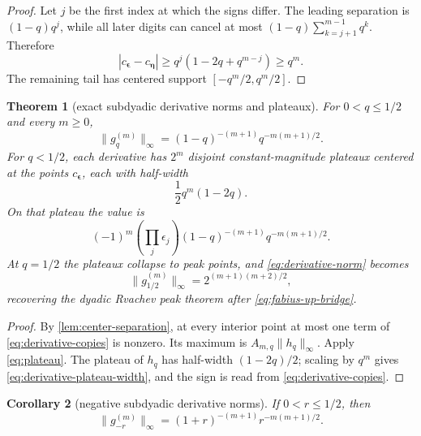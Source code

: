\documentclass[11pt]{article}
\newtheorem{theorem}{Theorem}[section]
\newtheorem{corollary}[theorem]{Corollary}
\theoremstyle{definition}
\theoremstyle{remark}
\begin{document}
\begin{proof}
Let $j$ be the first index at which the signs differ.  The leading separation is $(1-q)q^j$, while all later digits can cancel at most
$(1-q)\sum_{k=j+1}^{m-1}q^k$.  Therefore
\[
 |c_{\bm\epsilon}-c_{\bm\eta}|
 \ge q^j(1-2q+q^{m-j})\ge q^m.
\]
The remaining tail has centered support $[-q^m/2,q^m/2]$.
\end{proof}

\begin{theorem}[exact subdyadic derivative norms and plateaux]\label{thm:derivative-norm}
For $0<q\le1/2$ and every $m\ge0$,
\begin{equation}\label{eq:derivative-norm}
 \boxed{\quad
 \|g_q^{(m)}\|_\infty
 =(1-q)^{-(m+1)}q^{-m(m+1)/2}.
 \quad}
\end{equation}
For $q<1/2$, each derivative has $2^m$ disjoint constant-magnitude plateaux centered at the points $c_{\bm\epsilon}$, each with half-width
\begin{equation}\label{eq:derivative-plateau-width}
 \frac12q^m(1-2q).
\end{equation}
On that plateau the value is
\begin{equation}\label{eq:derivative-plateau-value}
 (-1)^m\left(\prod_j\epsilon_j\right)
 (1-q)^{-(m+1)}q^{-m(m+1)/2}.
\end{equation}
At $q=1/2$ the plateaux collapse to peak points, and \cref{eq:derivative-norm} becomes
\[
 \|g_{1/2}^{(m)}\|_\infty=2^{(m+1)(m+2)/2},
\]
recovering the dyadic Rvachev peak theorem after \cref{eq:fabius-up-bridge}.
\end{theorem}

\begin{proof}
By \cref{lem:center-separation}, at every interior point at most one term of \cref{eq:derivative-copies} is nonzero.  Its maximum is $A_{m,q}\|h_q\|_\infty$.  Apply \cref{eq:plateau}.  The plateau of $h_q$ has half-width $(1-2q)/2$; scaling by $q^m$ gives \cref{eq:derivative-plateau-width}, and the sign is read from \cref{eq:derivative-copies}.
\end{proof}

\begin{corollary}[negative subdyadic derivative norms]\label{cor:negative-derivative-norm}
If $0<r\le1/2$, then
\begin{equation}\label{eq:negative-derivative-norm}
 \|g_{-r}^{(m)}\|_\infty
 =(1+r)^{-(m+1)}r^{-m(m+1)/2}.
\end{equation}
\end{corollary}
\end{document}
